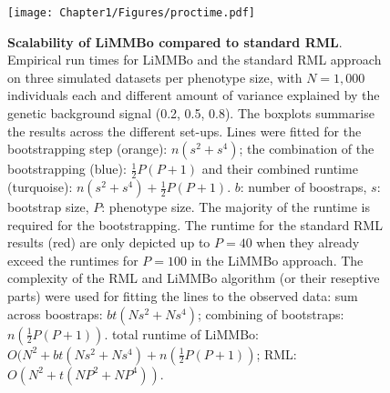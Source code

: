 \begin{figure}[hbtp]
	\centering
	\texttt{[image: Chapter1/Figures/proctime.pdf]}
	\caption{\textbf{Scalability of LiMMBo  compared to standard RML}. Empirical run times for LiMMBo and the standard RML approach on three simulated datasets per phenotype size, with \(N=1,000\) individuals each and different amount of variance explained by the genetic background signal (0.2, 0.5, 0.8). The boxplots summarise the results across the different set-ups. Lines were fitted for the bootstrapping step (orange): \(n(s^2 + s^4)\); the combination of the bootstrapping (blue): \(\frac{1}{2}P(P+1)\) and their combined runtime (turquoise):  \(n(s^2 + s^4) + \frac{1}{2}P(P+1)\). \(b\): number of boostraps, \(s\): bootstrap size, \(P\): phenotype size. The majority of the runtime is required for the bootstrapping. The runtime for the standard RML results (red) are only depicted up to \(P=40\) when they already exceed the runtimes for \(P=100\) in the LiMMBo approach. The complexity of the RML and LiMMBo algorithm (or their reseptive parts) were used for fitting the lines to the observed data: sum across boostraps: \(bt(Ns^2 + Ns^4)\); combining of bootstraps: \(n(\frac{1}{2}P(P+1))\). total runtime of LiMMBo: \(O(N^2 + bt(Ns^2 + Ns^4) + n(\frac{1}{2}P(P+1))\); RML: \(O(N^2 + t(NP^2 + NP^4))\). }
	 	\label{fig:proctime}
\end{figure}

